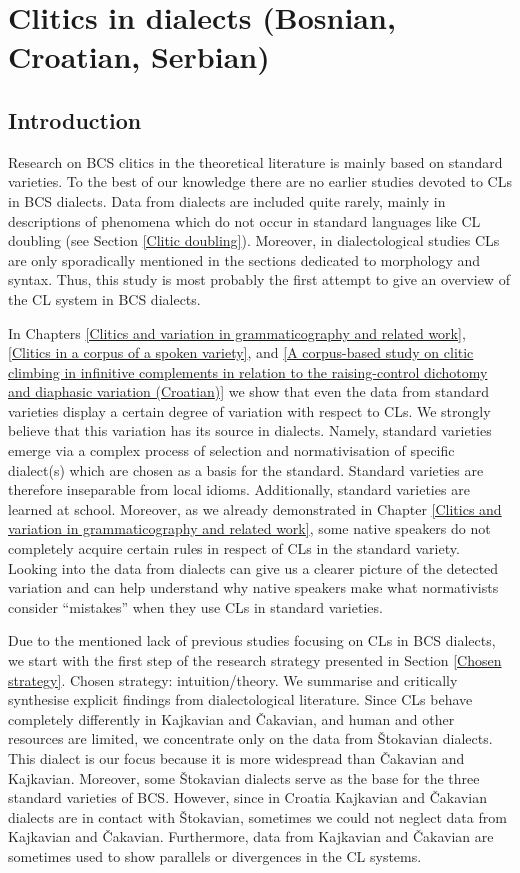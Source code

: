 \chapter[Clitics in dialects]{Clitics in dialects (Bosnian, Croatian, Serbian)}
\label{Clitics in dialects}
\section{Introduction}

Research on BCS clitics in the theoretical literature is mainly based on standard varieties. To the best of our knowledge there are no earlier studies devoted to CLs in BCS dialects. Data from dialects are included quite rarely, mainly in descriptions of phenomena which do not occur in standard languages like CL doubling (see Section \ref{Clitic doubling}). Moreover, in dialectological studies CLs are only sporadically mentioned in the sections dedicated to morphology and syntax. Thus, this study is most probably the first attempt to give an overview of the CL system in BCS dialects. 

In Chapters \ref{Clitics and variation in grammaticography and related work}, \ref{Clitics in a corpus of a spoken variety}, and \ref{A corpus-based study on clitic climbing in infinitive complements in relation to the raising-control dichotomy and diaphasic variation (Croatian)} we show that even the data from standard varieties display a certain degree of variation with respect to CLs. We strongly believe that this variation has its source in dialects. Namely, standard varieties emerge via a complex process of selection and normativisation of specific dialect(s) which are chosen as a basis for the standard. Standard varieties are therefore inseparable from local idioms. Additionally, standard varieties are learned at school. Moreover, as we already demonstrated in Chapter \ref{Clitics and variation in grammaticography and related work}, some native speakers do not completely acquire certain rules in respect of CLs in the standard variety. Looking into the data from dialects can give us a clearer picture of the detected variation and can help understand why native speakers make what normativists consider “mistakes” when they use CLs in standard varieties. 

Due to the mentioned lack of previous studies focusing on CLs in BCS dialects, we start with the first step of the research strategy presented in Section \ref{Chosen strategy}. Chosen strategy: intuition/theory. We summarise and critically synthesise explicit findings from dialectological literature. Since CLs behave completely differently in Kajkavian and Čakavian, and human and other resources are limited, we concentrate only on the data from Štokavian dialects. This dialect is our focus because it is more widespread than Čakavian and Kajkavian. Moreover, some Štokavian dialects serve as the base for the three standard varieties of BCS. However, since in Croatia Kajkavian and Čakavian dialects are in contact with Štokavian, sometimes we could not neglect data from Kajkavian and Čakavian. Furthermore, data from Kajkavian and Čakavian are sometimes used to show parallels or divergences in the CL systems. 

